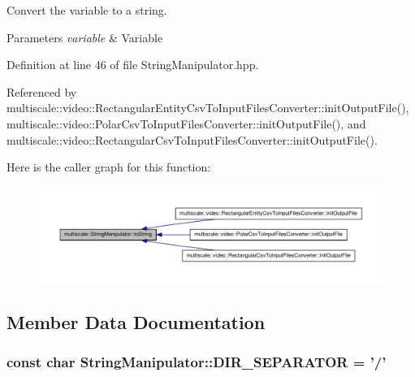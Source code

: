 \-Convert the variable to a string. 


\begin{DoxyParams}{\-Parameters}
{\em variable} & \-Variable \\
\hline
\end{DoxyParams}


\-Definition at line 46 of file \-String\-Manipulator.\-hpp.



\-Referenced by multiscale\-::video\-::\-Rectangular\-Entity\-Csv\-To\-Input\-Files\-Converter\-::init\-Output\-File(), multiscale\-::video\-::\-Polar\-Csv\-To\-Input\-Files\-Converter\-::init\-Output\-File(), and multiscale\-::video\-::\-Rectangular\-Csv\-To\-Input\-Files\-Converter\-::init\-Output\-File().



\-Here is the caller graph for this function\-:
\nopagebreak
\begin{figure}[H]
\begin{center}
\leavevmode
\includegraphics[width=350pt]{classmultiscale_1_1StringManipulator_a91858c4faa5ee210a9b67e4885835368_icgraph}
\end{center}
\end{figure}




\subsection{\-Member \-Data \-Documentation}
\hypertarget{classmultiscale_1_1StringManipulator_a3c975968005d8db010415d240b02b5db}{
\subsubsection[{\-D\-I\-R\-\_\-\-S\-E\-P\-A\-R\-A\-T\-O\-R}]{\setlength{\rightskip}{0pt plus 5cm}const char {\bf \-String\-Manipulator\-::\-D\-I\-R\-\_\-\-S\-E\-P\-A\-R\-A\-T\-O\-R} = '/'}}\label{classmultiscale_1_1StringManipulator_a3c975968005d8db010415d240b02b5db}


